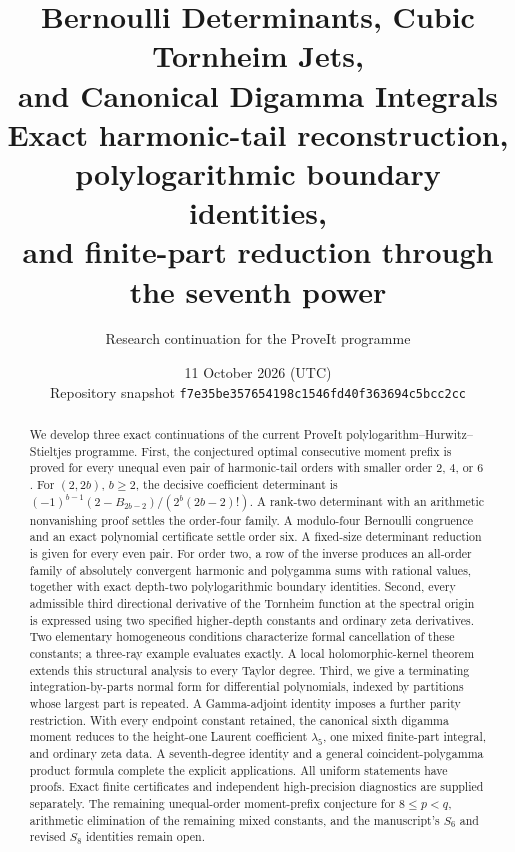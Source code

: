 \documentclass[11pt,a4paper]{article}
\title{\textbf{Bernoulli Determinants, Cubic Tornheim Jets,\\and Canonical Digamma Integrals}\\[8pt]
\large Exact harmonic-tail reconstruction, polylogarithmic boundary identities,\\
and finite-part reduction through the seventh power}
\author{Research continuation for the ProveIt programme}
\date{11 October 2026 (UTC)\\[4pt]
\small Repository snapshot \texttt{f7e35be357654198c1546fd40f363694c5bcc2cc}}
\numberwithin{equation}{section}
\theoremstyle{plain}
\theoremstyle{definition}
\theoremstyle{remark}
\begin{document}
\maketitle
\begin{abstract}
We develop three exact continuations of the current ProveIt
polylogarithm--Hurwitz--Stieltjes programme. First, the conjectured
optimal consecutive moment prefix is proved for every unequal even pair
of harmonic-tail orders with smaller order $2$, $4$, or $6$. For $(2,2b)$,
$b\ge2$, the decisive coefficient determinant is
$(-1)^{b-1}(2-B_{2b-2})/(2^b(2b-2)!)$. A rank-two determinant with an arithmetic nonvanishing proof settles the
order-four family. A modulo-four Bernoulli congruence and an exact
polynomial certificate settle order six. A fixed-size determinant reduction is given
for every even pair. For order two, a row of the inverse
produces an all-order family of absolutely convergent harmonic and
polygamma sums with rational values, together with exact depth-two
polylogarithmic boundary identities. Second, every admissible third directional
derivative of the Tornheim function at the spectral origin is expressed
using two specified higher-depth constants and ordinary zeta derivatives.
Two elementary homogeneous conditions characterize formal cancellation
of these constants; a three-ray example evaluates exactly. A local
holomorphic-kernel theorem extends this structural analysis to every
Taylor degree. Third, we give a terminating integration-by-parts normal
form for differential polynomials, indexed by partitions whose largest
part is repeated. A Gamma-adjoint identity imposes a further parity
restriction. With every endpoint constant retained, the canonical sixth
digamma moment reduces to the height-one Laurent coefficient
$\lambda_5$, one mixed finite-part integral, and ordinary zeta data.
A seventh-degree identity and a general coincident-polygamma product
formula complete the explicit applications. All uniform statements have proofs. Exact finite certificates and
independent high-precision diagnostics are supplied separately. The
remaining unequal-order moment-prefix conjecture for $8\le p<q$, arithmetic elimination
of the remaining mixed constants, and the manuscript's $S_6$ and revised
$S_8$ identities remain open.
\end{abstract}
\clearpage
\begingroup
\small
\setlength{\parskip}{0pt}
\tableofcontents
\endgroup
\clearpage













\end{document}
